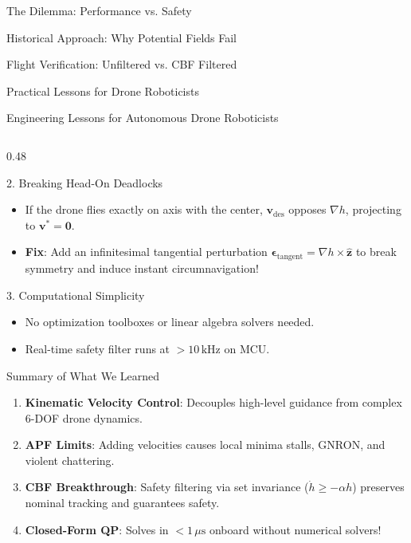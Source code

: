 \documentclass[aspectratio=169,10pt]{beamer}
\begin{document}
\begin{frame}{The Dilemma: Performance vs. Safety}
\begin{frame}{Historical Approach: Why Potential Fields Fail}
\begin{frame}{Flight Verification: Unfiltered vs. CBF Filtered}
\begin{frame}{Practical Lessons for Drone Roboticists}
\begin{frame}{Engineering Lessons for Autonomous Drone Roboticists}
\begin{columns}[T]
    \begin{column}{0.48\textwidth}
      \begin{block}{2. Breaking Head-On Deadlocks}
        \begin{itemize}
          \item If the drone flies exactly on axis with the center, $\mathbf{v}_{\mathrm{des}}$ opposes $\nabla h$, projecting to $\mathbf{v}^* = \mathbf{0}$.
          \item \textbf{Fix}: Add an infinitesimal tangential perturbation $\bm{\epsilon}_{\mathrm{tangent}} = \nabla h \times \hat{\mathbf{z}}$ to break symmetry and induce instant circumnavigation!
        \end{itemize}
      \end{block}

      \begin{block}{3. Computational Simplicity}
        \begin{itemize}
          \item No optimization toolboxes or linear algebra solvers needed.
          \item Real-time safety filter runs at $> 10\,\text{kHz}$ on MCU.
        \end{itemize}
      \end{block}
      \begin{exampleblock}{Summary of What We Learned}
        \small
        \begin{enumerate}
          \item \textbf{Kinematic Velocity Control}: Decouples high-level guidance from complex 6-DOF drone dynamics.
          \item \textbf{APF Limits}: Adding velocities causes local minima stalls, GNRON, and violent chattering.
          \item \textbf{CBF Breakthrough}: Safety filtering via set invariance ($\dot{h} \ge -\alpha h$) preserves nominal tracking and guarantees safety.
          \item \textbf{Closed-Form QP}: Solves in $< 1\,\mu\text{s}$ onboard without numerical solvers!
        \end{enumerate}
      \end{exampleblock}
    \end{column}
  \end{columns}
\end{frame}


\end{frame}
\end{frame}
\end{frame}
\end{frame}
\end{document}
